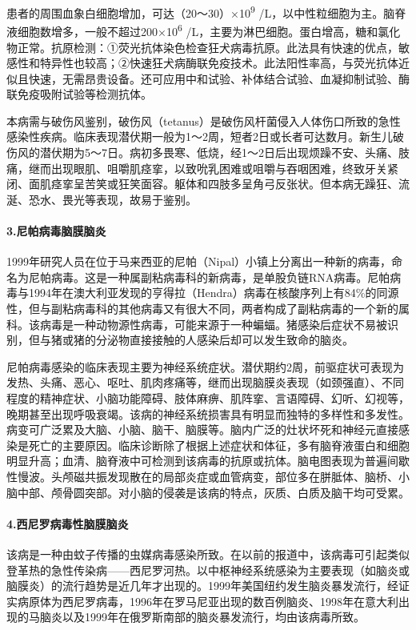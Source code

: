 患者的周围血象白细胞增加，可达（20～30）×10\textsuperscript{9}
/L，以中性粒细胞为主。脑脊液细胞数增多，一般不超过200×10\textsuperscript{6}
/L，主要为淋巴细胞。蛋白增高，糖和氯化物正常。抗原检测：①荧光抗体染色检查狂犬病毒抗原。此法具有快速的优点，敏感性和特异性也较高；②快速狂犬病酶联免疫技术。此法阳性率高，与荧光抗体近似且快速，无需昂贵设备。还可应用中和试验、补体结合试验、血凝抑制试验、酶联免疫吸附试验等检测抗体。

本病需与破伤风鉴别，破伤风（tetanus）是破伤风杆菌侵入人体伤口所致的急性感染性疾病。临床表现潜伏期一般为1～2周，短者2日或长者可达数月。新生儿破伤风的潜伏期为5～7日。病初多畏寒、低烧，经1～2日后出现烦躁不安、头痛、肢痛，继而出现眼肌、咀嚼肌痉挛，以致吮乳困难或咀嚼与吞咽困难，终致牙关紧闭、面肌痉挛呈苦笑或狂笑面容。躯体和四肢多呈角弓反张状。但本病无躁狂、流涎、恐水、畏光等表现，故易于鉴别。

\paragraph{3.尼帕病毒脑膜脑炎}

1999年研究人员在位于马来西亚的尼帕（Nipal）小镇上分离出一种新的病毒，命名为尼帕病毒。这是一种属副粘病毒科的新病毒，是单股负链RNA病毒。尼帕病毒与1994年在澳大利亚发现的亨得拉（Hendra）病毒在核酸序列上有84\%的同源性，但与副粘病毒科的其他病毒又有很大不同，两者构成了副粘病毒的一个新的属科。该病毒是一种动物源性病毒，可能来源于一种蝙蝠。猪感染后症状不易被识别，但与猪或猪的分泌物直接接触的人感染后却可以发生致命的脑炎。

尼帕病毒感染的临床表现主要为神经系统症状。潜伏期约2周，前驱症状可表现为发热、头痛、恶心、呕吐、肌肉疼痛等，继而出现脑膜炎表现（如颈强直）、不同程度的精神症状、小脑功能障碍、肢体麻痹、肌阵挛、言语障碍、幻听、幻视等，晚期甚至出现呼吸衰竭。该病的神经系统损害具有明显而独特的多样性和多发性。病变可广泛累及大脑、小脑、脑干、脑膜等。脑内广泛的灶状坏死和神经元直接感染是死亡的主要原因。临床诊断除了根据上述症状和体征，多有脑脊液蛋白和细胞明显升高；血清、脑脊液中可检测到该病毒的抗原或抗体。脑电图表现为普遍间歇性慢波。头颅磁共振发现散在的局部炎症或血管病变，部位多在胼胝体、脑桥、小脑中部、颅骨圆突部。对小脑的侵袭是该病的特点，灰质、白质及脑干均可受累。

\paragraph{4.西尼罗病毒性脑膜脑炎}

该病是一种由蚊子传播的虫媒病毒感染所致。在以前的报道中，该病毒可引起类似登革热的急性传染病------西尼罗河热。以中枢神经系统感染为主要表现（如脑炎或脑膜炎）的流行趋势是近几年才出现的。1999年美国纽约发生脑炎暴发流行，经证实病原体为西尼罗病毒，1996年在罗马尼亚出现的数百例脑炎、1998年在意大利出现的马脑炎以及1999年在俄罗斯南部的脑炎暴发流行，均由该病毒所致。

